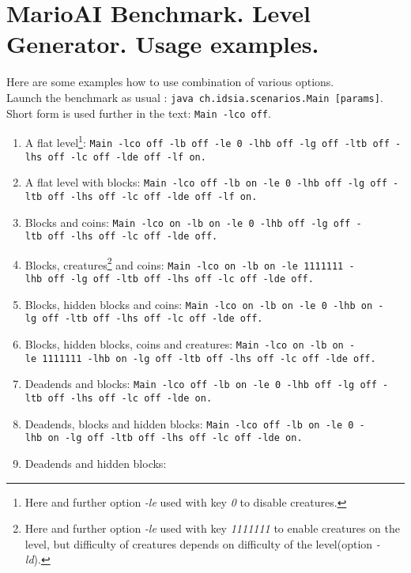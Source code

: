 \documentclass{report}
\begin{document}
\section*{MarioAI Benchmark. Level Generator. Usage examples.}
Here are some examples how to use combination of various options. \\
Launch the benchmark as usual : \texttt{java~ch.idsia.scenarios.Main [params]}. \\ Short form is used further in the text: \texttt{Main -lco off}.
\begin{enumerate}
\item A flat level\footnote{Here and further option \emph{-le} used with key \emph{0} to disable creatures.}: \newline %
\texttt{Main~-lco~off~-lb~off~-le~0~-lhb~off~-lg~off~-ltb~off~-lhs~off~-lc~off~-lde~off~-lf~on.}
\item A flat level with blocks:\newline %
\texttt{Main~-lco~off~-lb~on~-le~0~-lhb~off~-lg~off~-ltb~off~-lhs~off~-lc~off~-lde~off~-lf~on.}
\item Blocks and coins:\newline %
\texttt{Main~-lco~on~-lb~on~-le~0~-lhb~off~-lg~off~-ltb~off~-lhs~off~-lc~off~-lde~off.}
\item Blocks, creatures\footnote{Here and further option \emph{-le} used with key \emph{1111111} to enable creatures on the level, but difficulty of creatures depends on difficulty of the level(option \emph{-ld}).} and coins:\newline %
\texttt{Main~-lco~on~-lb~on~-le~1111111~-lhb~off~-lg~off~-ltb~off~-lhs~off~-lc~off~-lde~off.}
\item Blocks, hidden blocks and coins:\newline %
\texttt{Main~-lco~on~-lb~on~-le~0~-lhb~on~-lg~off~-ltb~off~-lhs~off~-lc~off~-lde~off.}
\item Blocks, hidden blocks, coins and creatures:\newline %
\texttt{Main~-lco~on~-lb~on~-le~1111111~-lhb~on~-lg~off~-ltb~off~-lhs~off~-lc~off~-lde~off.}
\item Deadends  and blocks:\newline %
\texttt{Main~-lco~off~-lb~on~-le~0~-lhb~off~-lg~off~-ltb~off~-lhs~off~-lc~off~-lde~on.}
\item Deadends, blocks and hidden blocks:\newline %
\texttt{Main~-lco~off~-lb~on~-le~0~-lhb~on~-lg~off~-ltb~off~-lhs~off~-lc~off~-lde~on.}
\item Deadends and hidden blocks:\newline %

\end{enumerate}
\end{document}
